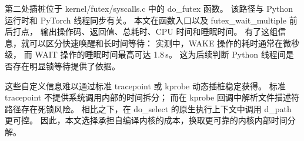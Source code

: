 第二处插桩位于 kernel/futex/syscalls.c 中的 do\_futex 函数。
该路径与 Python 运行时和 PyTorch 线程同步有关。
本文在函数入口以及 futex\_wait\_multiple 前后打点，
输出操作码、返回值、总耗时、CPU 时间和睡眠时间。
有了这组信息，就可以区分快速唤醒和长时间等待：
实测中，WAKE 操作的耗时通常在微秒级，
而 WAIT 操作的睡眠时间最高可达 1.8\,s。
这为后续判断 Python 线程间是否存在明显锁等待提供了依据。

这些自定义信息难以通过标准 tracepoint 或 kprobe 动态插桩稳定获得。
标准 tracepoint 不提供系统调用内部的时间拆分；
而在 kprobe 回调中解析文件描述符路径存在死锁风险。
相比之下，在 do\_select 的原生执行上下文中调用 d\_path 更可控。
因此，本文选择承担自编译内核的成本，换取更可靠的内核内部时间分解。
